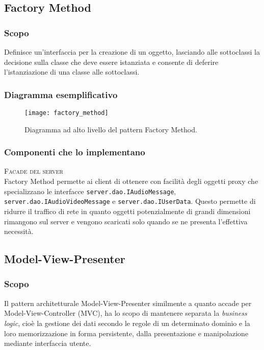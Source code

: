 \subsection{Factory Method}
\subsubsection{Scopo}
Definisce un'interfaccia per la creazione di un oggetto, lasciando alle sottoclassi la decisione sulla classe che deve essere istanziata e consente di deferire l'istanziazione di una classe alle sottoclassi.

\subsubsection{Diagramma esemplificativo}
\begin{figure}[h]
\centering
\texttt{[image: factory\_method]}
\caption{Diagramma ad alto livello del pattern Factory Method.}\label{fig:factory_method}
\end{figure}

\subsubsection{Componenti che lo implementano}
\begin{description}
  \item{\scshape\ttfamily Facade del server}\\
Factory Method permette ai client di ottenere con facilità degli oggetti proxy che specializzano le interfacce \texttt{server.dao.IAudioMessage}, \texttt{server.dao.IAudioVideoMessage} e \texttt{server.dao.IUserData}. Questo permette di ridurre il traffico di rete in quanto oggetti potenzialmente di grandi dimensioni rimangono sul server e vengono scaricati solo quando se ne presenta l'effettiva necessità.
\end{description}

\subsection{Model-View-Presenter}
\subsubsection{Scopo}
Il pattern architetturale \foreignlanguage{english}{Model-View-Presenter} similmente a quanto accade per \foreignlanguage{english}{Model-View-Controller} (MVC), ha lo scopo di mantenere separata la \textit{business logic}, cioè la gestione dei dati secondo le regole di un determinato dominio e la loro memorizzazione in forma persistente, dalla presentazione e manipolazione mediante interfaccia utente.
